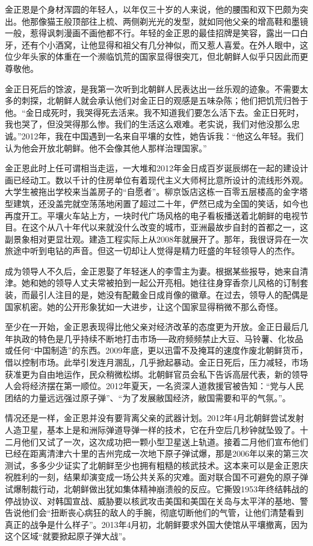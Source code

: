 金正恩是个身材浑圆的年轻人，以年仅三十岁的人来说，他的腰围和双下巴颇为突出。他那像猫王般顶部往上梳、两侧剃光光的发型，就如同他父亲的增高鞋和墨镜一般，惹得讽刺漫画不画他都不行。年轻的金正恩的最佳招牌是笑容，露出一口白牙，还有个小酒窝，让他显得和祖父有几分神似，而又惹人喜爱。在外人眼中，这位少年头家的体重在一个濒临饥荒的国家显得很突兀，但北朝鲜人似乎只因此而更尊敬他。

金正日死后的馀波，是我第一次听到北朝鲜人民表达出一丝乐观的迹象。不需要太多的刺探，北朝鲜人就会承认他们对金正日的观感是五味杂陈；他们把饥荒归咎于他。“金日成死时，我哭得死去活来。我不知道我们要怎么活下去。金正日死时，我也哭了，但没哭得那么惨。我们的生活这么艰难。老实说，我们对他没那么忠诚。”2012年，我在中国遇到一名来自平壤的女性，她告诉我：“他这么年轻。我们认为他会开放北朝鲜。他不会像其他人那样治理国家。”

金正恩此时上任可谓相当走运，一大堆和2012年金日成百岁诞辰绑在一起的建设计画已经动工。数以千计的住房单位有着现代主义大师柯比意所设计的流线形外观。大学生被拖出学校来当盖房子的“自愿者”。柳京饭店这栋一百零五层楼高的金字塔型建筑，还没盖完就空荡荡地闲置了超过二十年，俨然已成为全国的笑话，如今也再度开工。平壤火车站上方，一块时代广场风格的电子看板播送着北朝鲜的电视节目。在这个从八十年代以来就没什么改变的城市，亚洲最故步自封的首都之一，这副景象相对更显壮观。建造工程实际上从2008年就展开了。那年，我很讶异在一次旅途中听到电钻的声音。但这一切却让人觉得是精力旺盛的年轻领导人的杰作。

成为领导人不久后，金正恩娶了年轻迷人的李雪主为妻。根据某些报导，她来自清津。她和她的领导人丈夫常被拍到一起公开亮相。她往往身穿香奈儿风格的订制套装，而最引人注目的是，她没有配戴金日成肖像的徽章。在过去，领导人的配偶是国家机密。她的公开形象犹如一大进步，让这个国家显得稍微不那么奇怪。

至少在一开始，金正恩表现得比他父亲对经济改革的态度更为开放。金正日最后几年执政的特色是几乎持续不断地打击市场──政府频频禁止大豆、马铃薯、化妆品或任何“中国制造”的东西。2009年底，更以迅雷不及掩耳的速度作废北朝鲜货币，借以控制市场。此举引发连月溷乱，几乎掀起暴动。金正日死后，压力减轻，市场获准更为自由地运作，民众稍微松绑。北朝鲜官员会私下告诉高层代表，新的领导人会将经济摆在第一顺位。2012年夏天，一名资深人道救援官被告知：“党与人民团结的力量远远强过原子弹”、“为了发展敝国经济，敝国需要和平的气氛。”。

情况还是一样，金正恩并没有要背离父亲的武器计划。2012年4月北朝鲜尝试发射人造卫星，基本上是和洲际弹道导弹一样的技术，它在升空后几秒钟就坠毁了。十二月他们又试了一次，这次成功把一颗小型卫星送上轨道。接着二月他们宣布他们已经在距离清津六十里的吉州完成一次地下原子弹试爆，那是2006年以来的第三次测试，多多少少证实了北朝鲜至少也拥有粗糙的核武技术。这本来可以是金正恩庆祝胜利的一刻，结果却演变成一场公共关系的灾难。面对联合国不可避免的原子弹试爆制裁行动，北朝鲜做出犹如集体精神崩溃般的反应。它撕毁1953年终结韩战的停战协议、对韩国宣战、威胁要以核武攻击美国和美国在关岛与太平洋的基地、警告说他们会“扭断丧心病狂的敌人的手腕，彻底切断他们的气管，让他们清楚看到真正的战争是什么样子”。2013年4月初，北朝鲜要求外国大使馆从平壤撤离，因为这个区域“就要掀起原子弹大战”。

